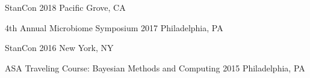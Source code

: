 

\begin{cvconfs}

  \cvconf
    {StanCon} %
    {2018} %
    {Pacific Grove, CA} %
    {}

  \cvconf
    {4th Annual Microbiome Symposium} %
    {2017} %
    {Philadelphia, PA} %
    {}

  \cvconf
    {StanCon} %
    {2016} %
    {New York, NY} %
    {}
    
  \cvconf
    {ASA Traveling Course: Bayesian Methods and Computing} %
    {2015} %
    {Philadelphia, PA} %
    {}
\end{cvconfs}

